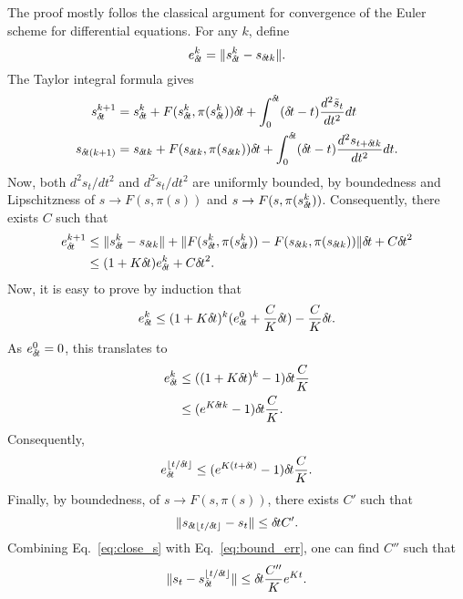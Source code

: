 The proof mostly follos the classical argument for convergence of the
Euler scheme for differential equations.
For any $k$, define
\begin{equation}
	e_{\delta\hspace{-.1em}t}^k = \|s_{\delta\hspace{-.1em}t}^k - s_{{\delta\hspace{-.1em}t} k}\|.
\end{equation}
The Taylor integral formula gives 
\begin{align}
	s_{\delta\hspace{-.1em}t}^{k + 1} &= s_{\delta\hspace{-.1em}t}^k + F(s_{\delta\hspace{-.1em}t}^k, \pi(s_{\delta\hspace{-.1em}t}^k)) {\delta\hspace{-.1em}t} +
	\int_{0}^{\delta\hspace{-.1em}t} ({\delta\hspace{-.1em}t} - t) \frac{d^2 \tilde{s}_t}{dt^2} dt\\
	s_{{\delta\hspace{-.1em}t}(k + 1)} &= s_{{\delta\hspace{-.1em}t} k} + F(s_{{\delta\hspace{-.1em}t} k}, \pi(s_{{\delta\hspace{-.1em}t} k})) {\delta\hspace{-.1em}t} +
	\int_0^{\delta\hspace{-.1em}t} ({\delta\hspace{-.1em}t} - t) \frac{d^2 s_{t + {\delta\hspace{-.1em}t} k}}{dt^2} dt.
\end{align}
Now, both $d^2 s_t/dt^2$ and $d^2 \tilde{s}_t/dt^2$ are uniformly bounded, by
boundedness and Lipschitzness of $s \rightarrow F(s, \pi(s))$ and $s
\rightarrow F(s, \pi(s_{\delta\hspace{-.1em}t}^k))$. Consequently, there exists $C$ such that
\begin{align}
	e_{\delta\hspace{-.1em}t}^{k + 1} &\leq \|s_{\delta\hspace{-.1em}t}^k - s_{{\delta\hspace{-.1em}t} k}\| + \|F(s_{\delta\hspace{-.1em}t}^k, \pi(s_{\delta\hspace{-.1em}t}^k)) - F(s_{{\delta\hspace{-.1em}t} k}, \pi(s_{{\delta\hspace{-.1em}t} k}))\| {\delta\hspace{-.1em}t} + C {\delta\hspace{-.1em}t}^2\\
			  &\leq (1 + K {\delta\hspace{-.1em}t}) e_{\delta\hspace{-.1em}t}^k + C {\delta\hspace{-.1em}t}^2.
\end{align}
Now, it is easy to prove by induction that
\begin{equation}
	e_{\delta\hspace{-.1em}t}^k \leq (1 + K {\delta\hspace{-.1em}t})^k (e_{\delta\hspace{-.1em}t}^0 + \frac{C}{K} {\delta\hspace{-.1em}t}) - \frac{C}{K}{\delta\hspace{-.1em}t}.
\end{equation}
As $e_{\delta\hspace{-.1em}t}^0 = 0$, this translates to
\begin{align}
	e_{\delta\hspace{-.1em}t}^k &\leq ((1 + K {\delta\hspace{-.1em}t})^k - 1) {\delta\hspace{-.1em}t} \frac{C}{K}\\
		    &\leq (e^{K {\delta\hspace{-.1em}t} k} - 1) {\delta\hspace{-.1em}t} \frac{C}{K}.
\end{align}
Consequently,
\begin{equation}
	e_{\delta\hspace{-.1em}t}^{\lfloor t / {\delta\hspace{-.1em}t} \rfloor} \leq (e^{K(t + {\delta\hspace{-.1em}t})} - 1) {\delta\hspace{-.1em}t} \frac{C}{K}.
	\label{eq:bound_err}
\end{equation}
Finally, by boundedness, of $s \rightarrow F(s, \pi(s))$, there exists $C'$ such that
\begin{equation}
	\|s_{{\delta\hspace{-.1em}t}\lfloor t / {\delta\hspace{-.1em}t} \rfloor} - s_t \| \leq {\delta\hspace{-.1em}t} C'.
	\label{eq:close_s}
\end{equation}
Combining Eq.~\eqref{eq:close_s} with Eq.~\eqref{eq:bound_err}, one can find $C''$ such that
\begin{equation}
	\|s_t - s_{\delta\hspace{-.1em}t}^{\lfloor t / {\delta\hspace{-.1em}t} \rfloor}\| \leq {\delta\hspace{-.1em}t} \frac{C''}{K} e^{Kt}.
\end{equation}
